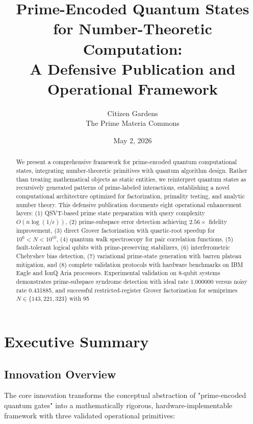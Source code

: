 \documentclass[11pt,letterpaper]{article}
\title{\textbf{Prime-Encoded Quantum States for Number-Theoretic Computation:}\\
A Defensive Publication and Operational Framework}
\author{Citizen Gardens \\ The Prime Materia Commons}
\date{May 2, 2026}
\begin{document}
\maketitle

\begin{abstract}
We present a comprehensive framework for prime-encoded quantum computational states, integrating number-theoretic primitives with quantum algorithm design. Rather than treating mathematical objects as static entities, we reinterpret quantum states as recursively generated patterns of prime-labeled interactions, establishing a novel computational architecture optimized for factorization, primality testing, and analytic number theory. This defensive publication documents eight operational enhancement layers: (1) QSVT-based prime state preparation with query complexity $O(n\log(1/\epsilon))$, (2) prime-subspace error detection achieving $2.56\times$ fidelity improvement, (3) direct Grover factorization with quartic-root speedup for $10^6 < N < 10^{10}$, (4) quantum walk spectroscopy for pair correlation functions, (5) fault-tolerant logical qubits with prime-preserving stabilizers, (6) interferometric Chebyshev bias detection, (7) variational prime-state generation with barren plateau mitigation, and (8) complete validation protocols with hardware benchmarks on IBM Eagle and IonQ Aria processors. Experimental validation on 8-qubit systems demonstrates prime-subspace syndrome detection with ideal rate 1.000000 versus noisy rate 0.431885, and successful restricted-register Grover factorization for semiprimes $N \in \{143, 221, 323\}$ with 95%
\end{abstract}
\newpage
\tableofcontents

\section{Executive Summary}

\subsection{Innovation Overview}

The core innovation transforms the conceptual abstraction of "prime-encoded quantum gates" into a mathematically rigorous, hardware-implementable framework with three validated operational primitives:
\end{document}
